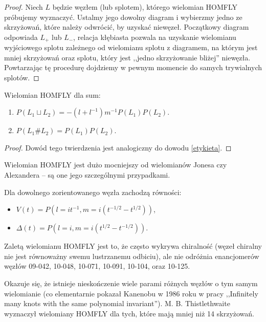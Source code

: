 \begin{proof}
Niech $L$ będzie węzłem (lub splotem), którego wielomian HOMFLY próbujemy wyznaczyć.
Ustalmy jego dowolny diagram i wybierzmy jedno ze skrzyżowań, które należy odwrócić, by uzyskać niewęzeł.
Początkowy diagram odpowiada $L_+$ lub $L_-$, relacja kłębiasta pozwala na uzyskanie wielomianu wyjściowego splotu zależnego od wielomianu splotu z diagramem, na którym jest mniej skrzyżowań oraz splotu, który jest ,,jedno skrzyżowanie bliżej'' niewęzła.
Powtarzając tę procedurę dojdziemy w pewnym momencie do samych trywialnych splotów.
\end{proof}

\begin{twierdzenie} Wielomian HOMFLY dla sum:
\begin{enumerate}
	\item $P(L_1 \sqcup L_2) = - (l + l^{-1}) m^{-1} P(L_1) P(L_2)$.
	\item $P(L_1 \# L_2) = P(L_1) P(L_2)$.
\end{enumerate}
\end{twierdzenie}

\begin{proof}
Dowód tego twierdzenia jest analogiczny do dowodu \ref{etykieta}.
\end{proof}

Wielomian HOMFLY jest dużo mocniejszy od wielomianów Jonesa czy Alexandera -- są one jego szczególnymi przypadkami.

\begin{twierdzenie} Dla dowolnego zorientowanego węzła zachodzą równości:
\begin{itemize}
\item $V(t) = P(l = it^{-1}, m = i(t^{-1/2} - t^{1/2}))$,
\item $\Delta(t) = P(l = i, m = i(t^{1/2} - t^{-1/2}))$.
\end{itemize}
\end{twierdzenie}

Zaletą wielomianu HOMFLY jest to, że często wykrywa chiralność (węzeł chiralny nie jest równoważny swemu lustrzanemu odbiciu), ale nie odróżnia enancjomerów węzłów 09-042, 10-048, 10-071, 10-091, 10-104, oraz 10-125.

Okazuje się, że istnieje nieskończenie wiele parami różnych węzłów o tym samym wielomianie (co elementarnie pokazał Kanenobu w  1986 roku w pracy ,,Infinitely many knots with the same polynomial invariant'').
M. B. Thistlethwaite wyznaczył wielomiany HOMFLY dla tych, które mają mniej niż 14 skrzyżowań.
